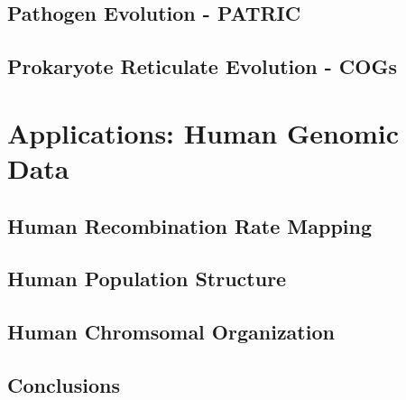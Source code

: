 \documentclass[letterpaper,12pt,twoside]{memoir}
\begin{document}
\chapter{Pathogen Evolution - PATRIC}
\label{ch:pathogens}
\lipsum

\chapter{Prokaryote Reticulate Evolution - COGs}
\label{ch:prokaryotes}
\lipsum
% 


\part{Applications: Human Genomic Data}
\label{part:human}

\chapter{Human Recombination Rate Mapping}
\lipsum

\chapter{Human Population Structure}
\lipsum

\chapter{Human Chromsomal Organization}
\lipsum
% 

\chapter{Conclusions}
\label{ch:conclusions}
\lipsum
% 

\backmatter

\SingleSpacing
\printbibliography
\end{document}

